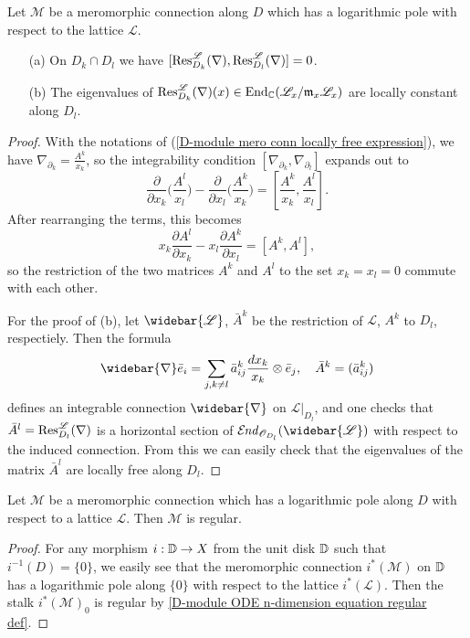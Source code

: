 \begin{proposition}\label{D-module mero conn logarithmic pole residue prop}
Let $\mathscr{M}$ be a meromorphic connection along $D$ which has a logarithmic pole with respect to the lattice $\mathscr{L}$.
\begin{enumerate}
    \item[(a)] On $D_k\cap D_l$ we have $[\mathrm{Res}^{\mathscr{L}}_{D_k}(\nabla),\mathrm{Res}^{\mathscr{L}}_{D_l}(\nabla)]=0$.
    \item[(b)] The eigenvalues of $\mathrm{Res}^{\mathscr{L}}_{D_k}(\nabla)(x)\in\mathrm{End}_{\mathbb{C}}(\mathscr{L}_x/\mathfrak{m}_x\mathscr{L}_x)$ are locally constant along $D_l$.
\end{enumerate}
\end{proposition}
\begin{proof}
With the notations of (\ref{D-module mero conn locally free expression}), we have $\nabla_{\partial_k}=\frac{A^k}{x_k}$, so the integrability condition $[\nabla_{\partial_k},\nabla_{\partial_l}]$ expands out to
\[\frac{\partial}{\partial x_k}\Big(\frac{A^l}{x_l}\Big)-\frac{\partial}{\partial x_l}\Big(\frac{A^k}{x_k}\Big)=[\frac{A^k}{x_k},\frac{A^l}{x_l}].\]
After rearranging the terms, this becomes
\[x_k\frac{\partial A^l}{\partial x_k}-x_l\frac{\partial A^k}{\partial x_l}=[A^k,A^l],\]
so the restriction of the two matrices $A^k$ and $A^l$ to the set $x_k=x_l=0$ commute with each other.\par
For the proof of (b), let $\widebar{\mathscr{L}}$, $\bar{A}^k$ be the restriction of $\mathscr{L}$, $A^k$ to $D_l$, respectiely. Then the formula
\[\widebar{\nabla}\bar{e}_i=\sum_{j,k\neq l}\bar{a}_{ij}^k\frac{dx_k}{x_k}\otimes\bar{e}_j,\quad \bar{A}^k=(\bar{a}_{ij}^k)\]
defines an integrable connection $\widebar{\nabla}$ on $\mathscr{L}|_{D_l}$, and one checks that $\bar{A}^l=\mathrm{Res}^\mathscr{L}_{D_l}(\nabla)$ is a horizontal section of $\sEnd_{\mathscr{O}_{D_l}}(\widebar{\mathscr{L}})$ with respect to the induced connection. From this we can easily check that the eigenvalues of the matrix $\bar{A}^l$ are locally free along $D_l$.
\end{proof}

\begin{proposition}\label{D-module mero conn logarithmic pole regular}
Let $\mathscr{M}$ be a meromorphic connection which has a logarithmic pole along $D$ with respect to a lattice $\mathscr{L}$. Then $\mathscr{M}$ is regular.
\end{proposition}
\begin{proof}
For any morphism $i:\mathbb{D}\to X$ from the unit disk $\mathbb{D}$ such that $i^{-1}(D)=\{0\}$, we easily see that the meromorphic connection $i^*(\mathscr{M})$ on $\mathbb{D}$ has a logarithmic pole along $\{0\}$ with respect to the lattice $i^*(\mathscr{L})$. Then the stalk $i^*(\mathscr{M})_0$ is regular by \cref{D-module ODE n-dimension equation regular def}.
\end{proof}

